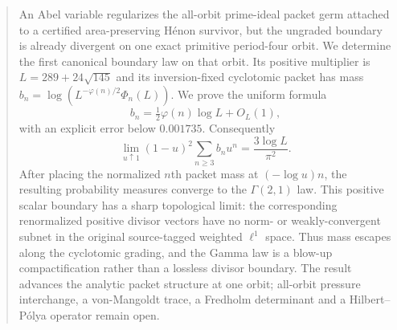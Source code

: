 \begin{abstract}
An Abel variable regularizes the all-orbit prime-ideal packet germ attached to
a certified area-preserving H\'enon survivor, but the ungraded boundary is
already divergent on one exact primitive period-four orbit.  We determine the
first canonical boundary law on that orbit.  Its positive multiplier is
$L=289+24\sqrt{145}$ and its inversion-fixed cyclotomic packet has mass
$b_n=\log\!\left(L^{-\varphi(n)/2}\Phi_n(L)\right)$.  We prove the uniform
formula
\[
b_n=\tfrac12\varphi(n)\log L+O_L(1),
\]
with an explicit error below $0.001735$.  Consequently
\[
\lim_{u\uparrow1}(1-u)^2\sum_{n\ge3}b_nu^n
=\frac{3\log L}{\pi^2}.
\]
After placing the normalized $n$th packet mass at
$(-\log u)n$, the resulting probability measures converge to the
$\Gamma(2,1)$ law.  This positive scalar boundary has a sharp topological
limit: the corresponding renormalized positive divisor vectors have no norm-
or weakly-convergent subnet in the original source-tagged weighted
$\ell^1$ space.  Thus mass escapes along the cyclotomic grading, and the
Gamma law is a blow-up compactification rather than a lossless divisor
boundary.  The result advances the analytic packet structure at one orbit;
all-orbit pressure interchange, a von-Mangoldt trace, a Fredholm determinant
and a Hilbert--P\'olya operator remain open.
\end{abstract}
